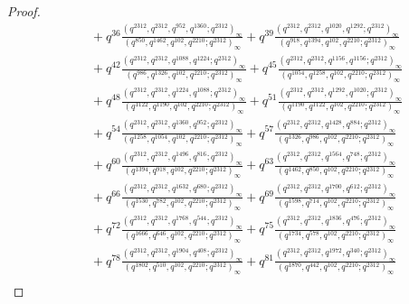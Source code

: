 \documentclass[10pt,a4paper]{amsart}
\begin{document}
\begin{proof}
\[\begin{aligned}
			&\quad + q^{36}\frac{(q^{2312}, q^{2312}, q^{952}, q^{1360}; q^{2312})_{\infty}}
			{(q^{850}, q^{1462}, q^{102}, q^{2210}; q^{2312})_{\infty}}
			+ q^{39}\frac{(q^{2312}, q^{2312}, q^{1020}, q^{1292}; q^{2312})_{\infty}}
			{(q^{918}, q^{1394}, q^{102}, q^{2210}; q^{2312})_{\infty}} \\
			&\quad +q^{42}\frac{(q^{2312}, q^{2312}, q^{1088}, q^{1224}; q^{2312})_{\infty}}
			{(q^{986}, q^{1326}, q^{102}, q^{2210}; q^{2312})_{\infty}} 
			+ q^{45}\frac{(q^{2312}, q^{2312}, q^{1156}, q^{1156}; q^{2312})_{\infty}}
			{(q^{1054}, q^{1258}, q^{102}, q^{2210}; q^{2312})_{\infty}} \\
			&\quad +  q^{48}\frac{(q^{2312}, q^{2312}, q^{1224}, q^{1088}; q^{2312})_{\infty}}
			{(q^{1122}, q^{1190}, q^{102}, q^{2210}; q^{2312})_{\infty}}
			+ q^{51}\frac{(q^{2312}, q^{2312}, q^{1292}, q^{1020}; q^{2312})_{\infty}}
			{(q^{1190}, q^{1122}, q^{102}, q^{2210}; q^{2312})_{\infty}} \\
			&\quad + q^{54}\frac{(q^{2312}, q^{2312}, q^{1360}, q^{952}; q^{2312})_{\infty}}
			{(q^{1258}, q^{1054}, q^{102}, q^{2210}; q^{2312})_{\infty}} 
			+ q^{57}\frac{(q^{2312}, q^{2312}, q^{1428}, q^{884}; q^{2312})_{\infty}}
			{(q^{1326}, q^{986}, q^{102}, q^{2210}; q^{2312})_{\infty}} \\
			&\quad + q^{60}\frac{(q^{2312}, q^{2312}, q^{1496}, q^{816}; q^{2312})_{\infty}}
			{(q^{1394}, q^{918}, q^{102}, q^{2210}; q^{2312})_{\infty}}
			+ q^{63}\frac{(q^{2312}, q^{2312}, q^{1564}, q^{748}; q^{2312})_{\infty}}
			{(q^{1462}, q^{850}, q^{102}, q^{2210}; q^{2312})_{\infty}} \\
			&\quad +  q^{66}\frac{(q^{2312}, q^{2312}, q^{1632}, q^{680}; q^{2312})_{\infty}}
			{(q^{1530}, q^{782}, q^{102}, q^{2210}; q^{2312})_{\infty}}
			+ q^{69}\frac{(q^{2312}, q^{2312}, q^{1700}, q^{612}; q^{2312})_{\infty}}
			{(q^{1598}, q^{714}, q^{102}, q^{2210}; q^{2312})_{\infty}} \\
			&\quad + q^{72}\frac{(q^{2312}, q^{2312}, q^{1768}, q^{544}; q^{2312})_{\infty}}
			{(q^{1666}, q^{646}, q^{102}, q^{2210}; q^{2312})_{\infty}}
			+ q^{75}\frac{(q^{2312}, q^{2312}, q^{1836}, q^{476}; q^{2312})_{\infty}}
			{(q^{1734}, q^{578}, q^{102}, q^{2210}; q^{2312})_{\infty}} \\
			&\quad +  q^{78}\frac{(q^{2312}, q^{2312}, q^{1904}, q^{408}; q^{2312})_{\infty}}
			{(q^{1802}, q^{510}, q^{102}, q^{2210}; q^{2312})_{\infty}} 
			+ q^{81}\frac{(q^{2312}, q^{2312}, q^{1972}, q^{340}; q^{2312})_{\infty}}
			{(q^{1870}, q^{442}, q^{102}, q^{2210}; q^{2312})_{\infty}} \\

\end{aligned}\]
\end{proof}
\end{document}
